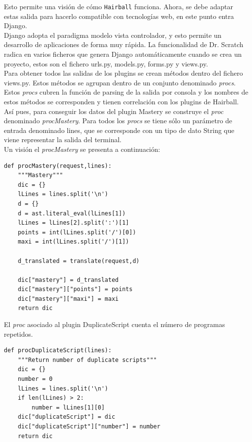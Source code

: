 \documentclass[a4paper, 12pt]{book}
\begin{document}
Esto permite una visión de cómo \texttt{Hairball} funciona. Ahora, se debe adaptar estas
salida para hacerlo compatible con tecnologías web, en este punto entra Django.  \\

Django adopta el paradigma modelo vista controlador, y esto permite un desarrollo de 
aplicaciones de forma muy rápida. La funcionalidad de Dr. Scratch radica en varios 
ficheros que genera Django automáticamente cuando se crea un proyecto, estos son el
fichero urls.py, models.py, forms.py y views.py. \\

Para obtener todos las salidas de los plugins se crean métodos dentro del fichero views.py.
Estos métodos se agrupan dentro de un conjunto denominado \emph{procs}. Estos \emph{procs}
cubren la función de parsing de la salida por consola y los nombres de estos métodos se
corresponden y tienen correlación con los plugins de Hairball. Así pues, para conseguir 
los datos del plugin Mastery se construye el \emph{proc} denominado \emph{procMastery}. 
Para todos los \emph{procs} se tiene sólo un parámetro de entrada denominado lines, que se
corresponde con un tipo de dato String que viene representar la salida del terminal. \\

Un visión el \emph{procMastery} se presenta a continuación:
\begingroup
\fontsize{8pt}{9pt}\selectfont
\begin{verbatim}
def procMastery(request,lines):
    """Mastery"""
    dic = {}
    lLines = lines.split('\n')
    d = {}
    d = ast.literal_eval(lLines[1])
    lLines = lLines[2].split(':')[1]
    points = int(lLines.split('/')[0])
    maxi = int(lLines.split('/')[1])
    
    d_translated = translate(request,d)

    dic["mastery"] = d_translated
    dic["mastery"]["points"] = points
    dic["mastery"]["maxi"] = maxi
    return dic
\end{verbatim}
\endgroup

El \emph{proc} asociado al plugin DuplicateScript cuenta el número de programas
repetidos.
\begingroup
\fontsize{8pt}{9pt}\selectfont
\begin{verbatim}
def procDuplicateScript(lines):
    """Return number of duplicate scripts"""
    dic = {}
    number = 0
    lLines = lines.split('\n')
    if len(lLines) > 2:
        number = lLines[1][0]
    dic["duplicateScript"] = dic
    dic["duplicateScript"]["number"] = number
    return dic
\end{verbatim}
\endgroup
\end{document}
